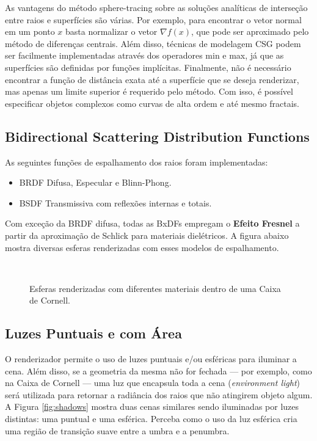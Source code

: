 \documentclass[11pt,a4paper]{article}
\begin{document}
As vantagens do método sphere-tracing sobre as soluções analíticas de interseção entre raios e superfícies são várias. Por exemplo, para encontrar o vetor normal em um ponto $x$ basta normalizar o vetor $\nabla f(x)$, que pode ser aproximado pelo método de diferenças centrais. Além disso, técnicas de modelagem CSG podem ser facilmente implementadas através dos operadores min e max, já que as superfícies são definidas por funções implícitas. Finalmente, não é necessário encontrar a função de distância exata até a superfície que se deseja renderizar, mas apenas um limite superior é requerido pelo método. Com isso, é possível especificar objetos complexos como curvas de alta ordem e até mesmo fractais.

\subsection{Bidirectional Scattering Distribution Functions}
As seguintes funções de espalhamento dos raios foram implementadas:
\begin{itemize}
\item BRDF Difusa, Especular e Blinn-Phong.
\item BSDF Transmissiva com reflexões internas e totais.
\end{itemize}

Com exceção da BRDF difusa, todas as BxDFs empregam o \textbf{Efeito Fresnel} a partir da aproximação de Schlick para materiais dielétricos. A figura abaixo mostra diversas esferas renderizadas com esses modelos de espalhamento.

\begin{figure}[!htpb]
  \centering
  \\
  \caption{Esferas renderizadas com diferentes materiais dentro de uma Caixa de Cornell.}
  \label{fig:spheres}
\end{figure}

\subsection{Luzes Puntuais e com Área }
O renderizador permite o uso de luzes puntuais e/ou esféricas para iluminar a cena. Além disso, se a geometria da mesma não for fechada --- por exemplo, como na Caixa de Cornell --- uma luz que encapsula toda a cena (\textit{environment light}) será utilizada para retornar a radiância dos raios que não atingirem objeto algum. A Figura \ref{fig:shadows} mostra duas cenas similares sendo iluminadas por luzes distintas: uma puntual e uma esférica. Perceba como o uso da luz esférica cria uma região de transição suave entre a umbra e a penumbra. 
\end{document}
